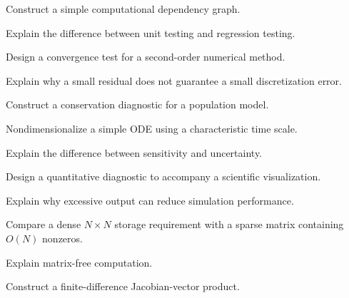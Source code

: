\begin{exercise}[3]
Construct a simple computational dependency graph.
\end{exercise}

\begin{exercise}[3]
Explain the difference between unit testing and regression testing.
\end{exercise}

\begin{exercise}[3]
Design a convergence test for a second-order numerical method.
\end{exercise}

\begin{exercise}[3]
Explain why a small residual does not guarantee a small discretization
error.
\end{exercise}

\begin{exercise}[3]
Construct a conservation diagnostic for a population model.
\end{exercise}

\begin{exercise}[3]
Nondimensionalize a simple ODE using a characteristic time scale.
\end{exercise}

\begin{exercise}[3]
Explain the difference between sensitivity and uncertainty.
\end{exercise}

\begin{exercise}[3]
Design a quantitative diagnostic to accompany a scientific visualization.
\end{exercise}

\begin{exercise}[3]
Explain why excessive output can reduce simulation performance.
\end{exercise}

\begin{exercise}[3]
Compare a dense \(N\times N\) storage requirement with a sparse matrix
containing \(O(N)\) nonzeros.
\end{exercise}

\begin{exercise}[3]
Explain matrix-free computation.
\end{exercise}

\begin{exercise}[3]
Construct a finite-difference Jacobian-vector product.
\end{exercise}

